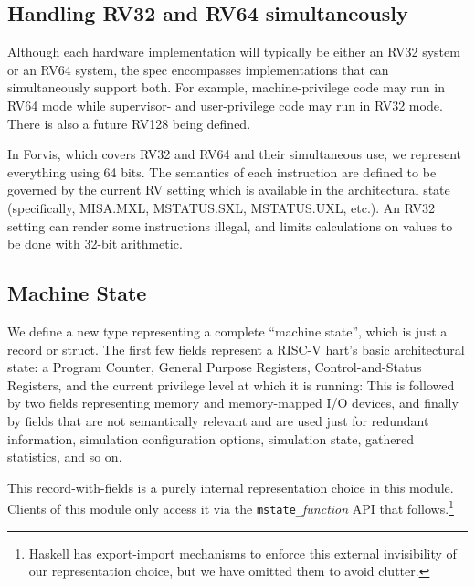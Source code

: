 \documentclass[11pt]{article}
\begin{document}

\subsection{Handling RV32 and RV64 simultaneously}

Although each hardware implementation will typically be either an RV32
system or an RV64 system, the spec encompasses implementations that
can simultaneously support both.  For example, machine-privilege code
may run in RV64 mode while supervisor- and user-privilege code may run
in RV32 mode.  There is also a future RV128 being defined.

In Forvis, which covers RV32 and RV64 and their simultaneous use, we
represent everything using 64 bits.  The semantics of each instruction
are defined to be governed by the current RV setting which is
available in the architectural state (specifically, MISA.MXL,
MSTATUS.SXL, MSTATUS.UXL, etc.).  An RV32 setting can render some
instructions illegal, and limits calculations on values to be done
with 32-bit arithmetic.


\subsection{Machine State}

We define a new type representing a complete ``machine state'', which
is just a record or struct.  The first few fields represent a RISC-V
hart's basic architectural state: a Program Counter, General Purpose
Registers, Control-and-Status Registers, and the current privilege
level at which it is running: This is followed by two fields
representing memory and memory-mapped I/O devices, and finally by
fields that are not semantically relevant and are used just for
redundant information, simulation configuration options, simulation
state, gathered statistics, and so on.



This record-with-fields is a purely internal representation choice in
this module.  Clients of this module only access it via the
\verb|mstate_|{\it{}function} API that follows.\footnote{Haskell has
export-import mechanisms to enforce this external invisibility of our
representation choice, but we have omitted them to avoid clutter.}
\end{document}
